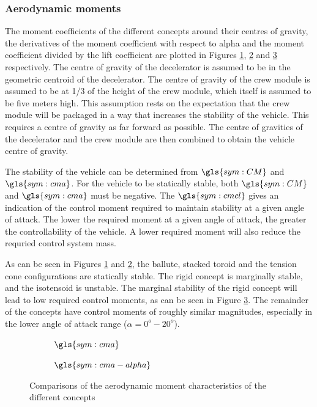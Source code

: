 \subsubsection{Aerodynamic moments}
The moment coefficients of the different concepts around their centres of gravity, the derivatives of the moment coefficient with respect to alpha and the moment coefficient divided by the lift coefficient are plotted in Figures \ref{fig:cm}, \ref{fig:cmalpha} and \ref{fig:cmplots} respectively. The centre of gravity of the decelerator is assumed to be in the geometric centroid of the decelerator. The centre of gravity of the crew module is assumed to be at 1/3 of the height of the crew module, which itself is assumed to be five meters high. This assumption rests on the expectation that the crew module will be packaged in a way that increases the stability of the vehicle. This requires a centre of gravity as far forward as possible. The centre of gravities of the decelerator and the crew module are then combined to obtain the vehicle centre of gravity. 

The stability of the vehicle can be determined from $\gls{sym:CM}$ and $\gls{sym:cma}$. For the vehicle to be statically stable, both $\gls{sym:CM}$ and $\gls{sym:cma}$ must be negative. The $\gls{sym:cmcl}$ gives an indication of the control moment required to maintain stability at a given angle of attack. The lower the required moment at a given angle of attack, the greater the controllability of the vehicle. A lower required moment will also reduce the requried control system mass. 
 
As can be seen in Figures \ref{fig:cm} and \ref{fig:cmalpha}, the ballute, stacked toroid and the tension cone configurations are statically stable. The rigid concept is marginally stable, and the isotensoid is unstable. The marginal stability of the rigid concept will lead to low required control moments, as can be seen in Figure \ref{fig:cmplots}. The remainder of the concepts have control moments of roughly similar magnitudes, especially in the lower angle of attack range ($\alpha = 0^{o}-20^{o}$).  
 
\begin{figure}[h]
	\centering
	\begin{subfigure}[b]{0.49\textwidth}

		\setlength{} 
		\setlength{}
				

		\caption{$\gls{sym:cma}$}
		\label{fig:cm}
	\end{subfigure}
	\begin{subfigure}[b]{0.49\textwidth}

		\setlength{} 
		\setlength{}
				

		\caption{$\gls{sym:cma-alpha}$}
		\label{fig:cmalpha}
	\end{subfigure}
	\caption{Comparisons of the aerodynamic moment characteristics of the different concepts}
	\label{fig:cmplots}
\end{figure}


